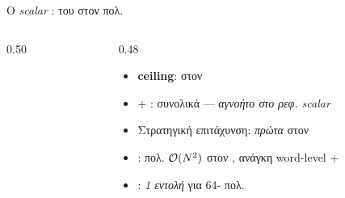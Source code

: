 \begin{frame}{Ο \emph{ scalar} :  του \instret στον πολ.}
  \begin{columns}[T]
    \begin{column}{0.50\textwidth}
      \centering
      \resizebox{0.95\columnwidth}{!}{%
      }
    \end{column}
    \begin{column}{0.48\textwidth}
      \vspace{0.5em}
      \begin{itemize}
        \item \textbf{ ceiling}:   στον \polymul
        \item {} + :  συνολικά — \emph{αγνοήτο στο ρεφ. scalar}
        \item Στρατηγική επιτάχυνση: \emph{πρώτα} στον \polymul
        \item \GFpoly: πολ. $\mathcal{O}(N^2)$ στον ,
              ανάγκη word-level  + 
        \item {} \clmul: \emph{1 εντολή} για 64-  πολ.
      \end{itemize}
    \end{column}
  \end{columns}
\end{frame}
